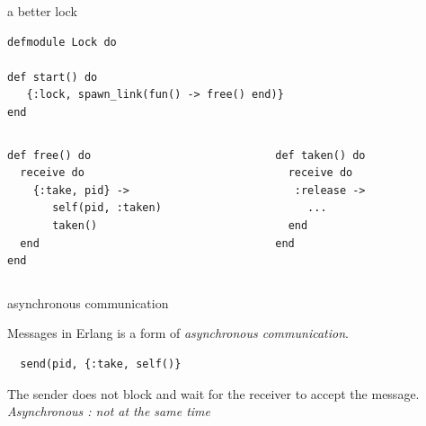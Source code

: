\begin{frame}[fragile]{a better lock}

\begin{verbatim}
defmodule Lock do

def start() do
   {:lock, spawn_link(fun() -> free() end)}
end
\end{verbatim}
\begin{columns}
  \begin{column}{0.5\linewidth}
\begin{verbatim}
def free() do
  receive do
    {:take, pid} ->
       self(pid, :taken)
       taken()
  end
end
\end{verbatim}
  \end{column}
  \begin{column}{0.5\linewidth}
\begin{verbatim}  
def taken() do
  receive do
   :release ->
     ...
  end
end

\end{verbatim}
  \end{column}
\end{columns}
\end{frame}


\begin{frame}[fragile]{asynchronous communication}

Messages in Erlang is a form of {\em asynchronous communication}.

\pause\vspace{20pt}
\begin{verbatim}
  send(pid, {:take, self()}
\end{verbatim}

\pause\vspace{20pt}
The sender does not block and wait for the receiver to accept the message. 
\pause\vspace{20pt}
{\em Asynchronous : not at the same time}
\end{frame}


